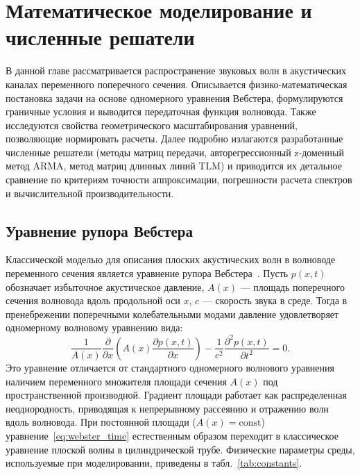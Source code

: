 \chapter{Математическое моделирование и численные решатели}
\label{ch:theory_and_numerical}

В данной главе рассматривается распространение звуковых волн в акустических каналах переменного поперечного сечения. Описывается физико-математическая постановка задачи на основе одномерного уравнения Вебстера, формулируются граничные условия и выводится передаточная функция волновода. Также исследуются свойства геометрического масштабирования уравнений, позволяющие нормировать расчеты. Далее подробно излагаются разработанные численные решатели (методы матриц передачи, авторегрессионный z-доменный метод ARMA, метод матриц длинных линий TLM) и приводится их детальное сравнение по критериям точности аппроксимации, погрешности расчета спектров и вычислительной производительности.

\section{Уравнение рупора Вебстера}
\label{sec:webster}

Классической моделью для описания плоских акустических волн в волноводе переменного сечения является уравнение рупора Вебстера~\cite{webster1919,morse1968}. Пусть $p(x,t)$ обозначает избыточное акустическое давление, $A(x)$ --- площадь поперечного сечения волновода вдоль продольной оси $x$, $c$ --- скорость звука в среде. Тогда в пренебрежении поперечными колебательными модами давление удовлетворяет одномерному волновому уравнению вида:
\begin{equation}
    \frac{1}{A(x)}
    \frac{\partial}{\partial x}
    \left(
        A(x)
        \frac{\partial p(x,t)}{\partial x}
    \right)
    -
    \frac{1}{c^2}
    \frac{\partial^2 p(x,t)}{\partial t^2}
    = 0.
    \label{eq:webster_time}
\end{equation}
Это уравнение отличается от стандартного одномерного волнового уравнения наличием переменного множителя площади сечения $A(x)$ под пространственной производной. Градиент площади работает как распределенная неоднородность, приводящая к непрерывному рассеянию и отражению волн вдоль волновода. При постоянной площади ($A(x) = \mathrm{const}$) уравнение~\eqref{eq:webster_time} естественным образом переходит в классическое уравнение плоской волны в цилиндрической трубе. Физические параметры среды, используемые при моделировании, приведены в табл.~\ref{tab:constants}.

